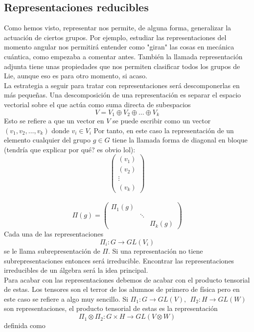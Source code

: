 \documentclass[12pt]{article}
\begin{document}
\subsection*{Representaciones reducibles}
\noindent Como hemos visto, representar nos permite, de alguna forma, generalizar la actuación de ciertos grupos. Por ejemplo, estudiar las representaciones del momento angular nos permitirá entender como "giran" las cosas en mecánica cuántica, como empezaba a comentar antes. También la llamada representación adjunta tiene unas propiedades que nos permiten clasificar todos los grupos de Lie, aunque eso es para otro momento, si acaso. \\ La estrategia a seguir para tratar con representaciones será descomponerlas en más pequeñas. Una descomposición de una representación es separar el espacio vectorial sobre el que actúa como suma directa de subespacios
$$V=V_1 \oplus V_2\oplus \dots \oplus V_k$$ Esto se refiere a que un vector en $V$ se puede escribir como un vector $(v_1, v_2, \dots, v_k)$ donde $v_i \in V_i$ Por tanto, en este caso la representación  de un elemento cualquier del grupo $g \in G$ tiene la llamada forma de diagonal en bloque (tendría que explicar por qué? es obvio lol): 
\\
\begin{equation}
    \begin{pmatrix}
        (v_1) \\ (v_2) \\ \vdots \\ (v_k)
    \end{pmatrix}
\end{equation}
\\ 
$$\Pi(g)=\begin{pmatrix}
    \Pi_1(g) \\ & \ddots \\ & & \Pi_k(g)
\end{pmatrix}$$
Cada una de las representaciones $$\Pi_i: G\rightarrow GL(V_i)$$ se le llama subrepresentación de $\Pi$. Si una representación no tiene subrepresentaciones entonces será irreducible. Encontrar las representaciones irreducibles de un álgebra será la idea principal.\\ Para acabar con las representaciones debemos de acabar con el producto tensorial de estas. Los tensores son el terror de los alumnos de primero de física pero en este caso se refiere a algo muy sencillo. Si $\Pi_1: G\rightarrow GL(V), \ \ \Pi_2:H\rightarrow GL(W)$ son representaciones, el producto tensorial de estas es la representación $$\Pi_1 \otimes \Pi_2: G\times H \rightarrow GL(V\otimes W)$$ definida como
\end{document}
